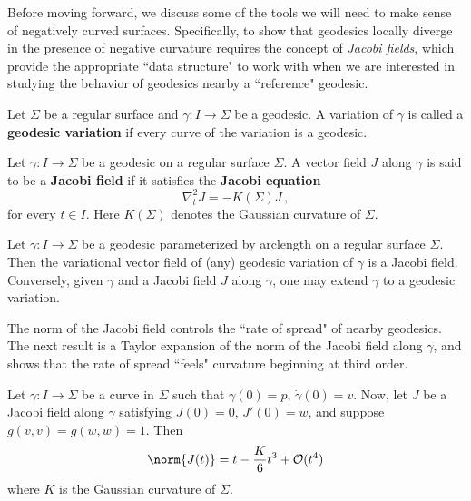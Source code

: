 Before moving forward, we discuss some of the tools we will need to make sense of negatively curved surfaces. Specifically, to show that geodesics locally diverge in the presence of negative curvature requires the concept of \textit{Jacobi fields}, which provide the appropriate ``data structure" to work with when we are interested in studying the behavior of geodesics nearby a ``reference" geodesic.
\begin{definition}[]\label{}
Let $\Sigma$ be a regular surface and $\gamma: I \to \Sigma$ be a geodesic. A variation of $\gamma$ is called a \textbf{geodesic variation} if every curve of the variation is a geodesic.
\end{definition}
\begin{definition}[]\label{}
Let $\gamma: I \to \Sigma$ be a geodesic on a regular surface $\Sigma$. A vector field $J$ along $\gamma$ is said to be a \textbf{Jacobi field} if it satisfies the \textbf{Jacobi equation}
\begin{equation}\label{}
\nabla^2_t J = -K(\Sigma) J \, ,
\end{equation}
for every $t \in I$. Here $K(\Sigma)$ denotes the Gaussian curvature of $\Sigma$.
\end{definition}
\begin{proposition}[]\label{}
Let $\gamma: I \to \Sigma$ be a geodesic parameterized by arclength on a regular surface $\Sigma$. Then the variational vector field of (any) geodesic variation of $\gamma$ is a Jacobi field. Conversely, given $\gamma$ and a Jacobi field $J$ along $\gamma$, one may extend $\gamma$ to a geodesic variation.
\end{proposition}
%
The norm of the Jacobi field controls the ``rate of spread" of nearby geodesics. The next result is a Taylor expansion of the norm of the Jacobi field along $\gamma$, and shows that the rate of spread ``feels" curvature beginning at third order.
%
\begin{theorem}[]\label{thm:geodesic-deviation}
Let $\gamma: I \to \Sigma$ be a curve in $\Sigma$ such that $\gamma(0)=p$, $\dot{\gamma}(0) = v$. Now, let $J$ be a Jacobi field along $\gamma$ satisfying $J(0)=0$, $J'(0)=w$, and suppose $g(v,v)=g(w,w)=1$. Then
\begin{equation}\label{}
\norm{J(t)} = t - \frac{K}{6}t^3 + \order(t^4)
\end{equation}
where $K$ is the Gaussian curvature of $\Sigma$.
\end{theorem}
